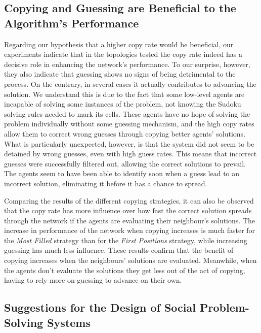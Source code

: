 \documentclass{article}
\begin{document}
\subsection{Copying and Guessing are Beneficial to the Algorithm's Performance}

Regarding our hypothesis that a higher copy rate would be beneficial, our experiments indicate that in the topologies tested the copy rate indeed has a decisive role in enhancing the network's performance. To our surprise, however, they also indicate that guessing shows no signs of being detrimental to the process. On the contrary, in several cases it actually contributes to advancing the solution. We understand this is due to the fact that some low-level agents are incapable of solving some instances of the problem, not knowing the Sudoku solving rules needed to mark its cells. These agents have no hope of solving the problem individually without some guessing mechanism, and the high copy rates allow them to correct wrong guesses through copying better agents' solutions. What is particularly unexpected, however, is that the system did not seem to be detained by wrong guesses, even with high guess rates. This means that incorrect guesses were successfully filtered out, allowing the correct solutions to prevail. The agents seem to have been able to identify soon when a guess lead to an incorrect solution, eliminating it before it has a chance to spread.

Comparing the results of the different copying strategies, it can also be observed that the copy rate has more influence over how fast the correct solution spreads through the network if the agents are evaluating their neighbour's solutions. The increase in performance of the network when copying increases is much faster for the \emph{Most Filled} strategy than for the \emph{First Positions} strategy, while increasing guessing has much less influence. These results confirm that the benefit of copying increases when the neighbours' solutions are evaluated. Meanwhile, when the agents don't evaluate the solutions they get less out of the act of copying, having to rely more on guessing to advance on their own.

\subsection{Suggestions for the Design of Social Problem-Solving Systems}
\end{document}
